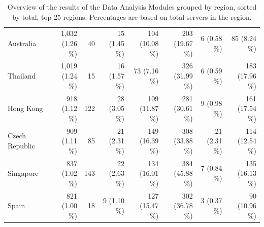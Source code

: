 \begin{table}[tb]
\begin{tabular}{@{} l r r r r rrr @{}}
Australia&1,032 (1.26 \%) & 40 & 15 (1.45 \%) & 104 (10.08 \%) & 203 (19.67 \%) & 6 (0.58 \%) & 85 (8.24 \%)\\
Thailand&1,019 (1.24 \%) & 15 & 16 (1.57 \%) & 73 (7.16 \%) & 326 (31.99 \%) & 6 (0.59 \%) & 183 (17.96 \%)\\
Hong Kong&918 (1.12 \%) & 122 & 28 (3.05 \%) & 109 (11.87 \%) & 281 (30.61 \%) & 9 (0.98 \%) & 161 (17.54 \%)\\
Czech Republic &909 (1.11 \%) & 85 & 21 (2.31 \%) & 149 (16.39 \%) & 308 (33.88 \%) & 21 (2.31 \%) & 114 (12.54 \%)\\
Singapore&837 (1.02 \%) & 143 & 22 (2.63 \%) & 134 (16.01 \%) & 384 (45.88 \%) & 7 (0.84 \%) & 135 (16.13 \%)\\
Spain&821 (1.00 \%) & 18 & 9 (1.10 \%) & 127 (15.47 \%) & 302 (36.78 \%) & 3 (0.37 \%) & 90 (10.96 \%)\\
         \bottomrule
    \end{tabular}
    \caption{Overview of the results of the Data Analysis Modules grouped by region, sorted by total, top 25 regions. Percentages are based on total servers in the region. 
    }
    \label{tab:results_overview}
\end{table}